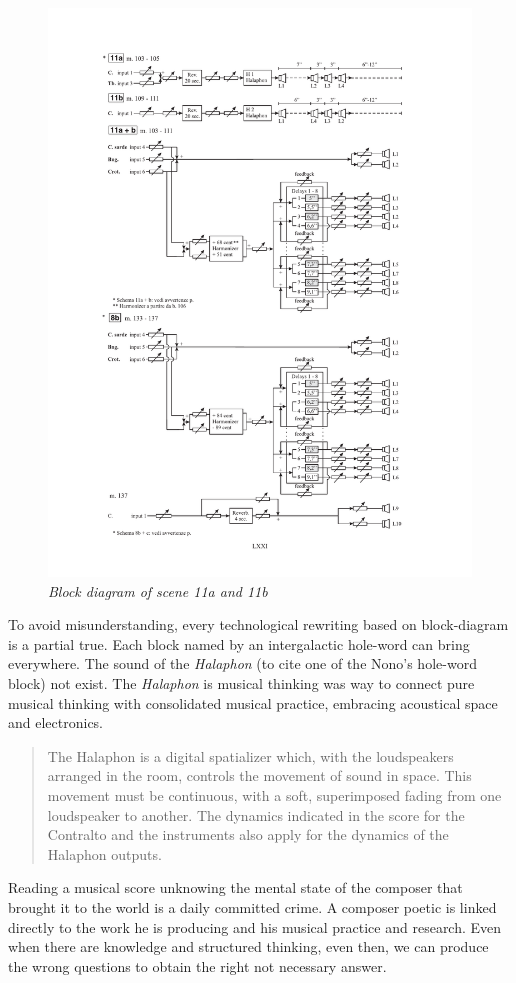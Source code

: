 \documentclass[twoside,a4paper]{article}
\begin{document}
\begin{figure}[ht]
\centerline{\includegraphics[width=.45\textwidth]{img/re-diagramma11}}
\caption{\label{re-dia-6c}{\it Block diagram of scene 11a and 11b}}
\end{figure}

To avoid misunderstanding, every technological rewriting based on block-diagram is a partial true. Each block named by an intergalactic hole-word can bring everywhere. The sound of the \emph{Halaphon} (to cite one of the Nono's hole-word block) not exist. The \emph{Halaphon} is musical thinking was way to connect pure musical thinking with consolidated musical practice, embracing acoustical space and electronics. 

\begin{quote}
The Halaphon is a digital spatializer which, with the loudspeakers arranged in the room, controls the movement of sound in space. This movement must be continuous, with a soft, superimposed fading from one loudspeaker to another. The dynamics indicated in the score for the Contralto and the instruments also apply for the dynamics of the Halaphon outputs\cite{nlre87}. %
\end{quote}

Reading a musical score unknowing the mental state of the composer that brought it to the world is a daily committed crime. A composer poetic is linked directly to the work he is producing and his musical practice and research. Even when there are knowledge and structured thinking, even then, we can produce the wrong questions to obtain the right not necessary answer.  
\end{document}
